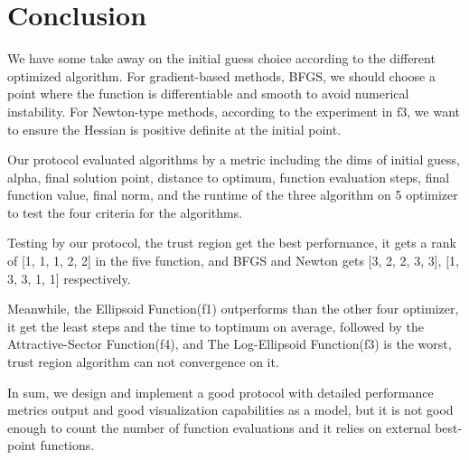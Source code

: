 \documentclass[12pt]{article}
\begin{document}

\section{Conclusion}

We have some take away on the initial guess choice according to the different optimized algorithm. For gradient-based methods, BFGS, we should choose a point where the function is differentiable and smooth to avoid numerical instability. For Newton-type methods, according to the experiment in f3, we want to ensure the Hessian is positive definite at the initial point. 

Our protocol evaluated algorithms by a metric including the dims of initial guess, alpha, final solution point, distance to optimum, function evaluation steps, final function value, final norm, and the runtime of the three algorithm on 5 optimizer to test the four criteria for the algorithms.

Testing by our protocol, the trust region get the best performance, it gets a rank of [1, 1, 1, 2, 2] in the five function, and BFGS and Newton gets [3, 2, 2, 3, 3], [1, 3, 3, 1, 1] respectively.

Meanwhile, the Ellipsoid Function(f1) outperforms than the other four optimizer, it get the least steps and the time to toptimum on average, followed by the Attractive-Sector Function(f4), and The Log-Ellipsoid Function(f3) is the worst, trust region algorithm can not convergence on it.

In sum, we design and implement a good protocol with detailed performance metrics output and good visualization capabilities as a model, but it is not good enough to count the number of function evaluations and it relies on external best-point functions.



\end{document}
